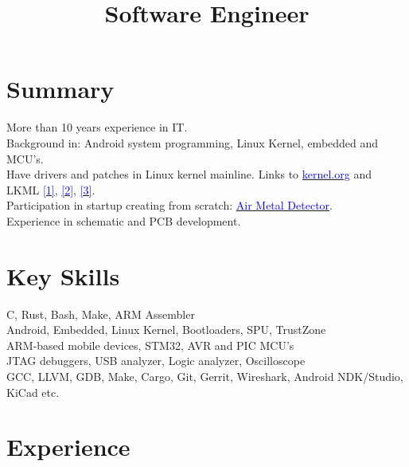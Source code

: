 \documentclass[11pt,a4paper]{moderncv}
\title{Software Engineer}
\begin{document}
\maketitle

\section{Summary}

More than 10 years experience in IT.\\
Background in: Android system programming, Linux Kernel, embedded and MCU's.\\
Have drivers and patches in Linux kernel mainline. Links to
\href{https://git.kernel.org/cgit/linux/kernel/git/torvalds/linux.git/log/?id=refs\%2Ftags\%2Fv4.2-rc4&qt=author&q=Oleksandr+Kravchenko}{\textcolor{blue}{kernel.org}}
and LKML
\href{https://lkml.org/lkml/2013/7/22/259}{\textcolor{blue}{[1]}},
\href{https://lkml.org/lkml/2013/8/28/187}{\textcolor{blue}{[2]}},
\href{https://lkml.org/lkml/2013/7/19/99}{\textcolor{blue}{[3]}}.\\
Participation in startup creating from scratch: \href{https://www.kickstarter.com/projects/airmetaldetectors/air-metal-detector-the-smart-bluetooth-metal-detec}{\textcolor{blue}{Air Metal Detector}}.\\
Experience in schematic and PCB development.

\section{Key Skills}

C, Rust, Bash, Make, ARM Assembler\\
Android, Embedded, Linux Kernel, Bootloaders, SPU, TrustZone\\ 
ARM-based mobile devices, STM32, AVR and PIC MCU’s\\
JTAG debuggers, USB analyzer, Logic analyzer, Oscilloscope\\
GCC, LLVM, GDB, Make, Cargo, Git, Gerrit, Wireshark, Android NDK/Studio, KiCad etc.

\section{Experience}
\end{document}
